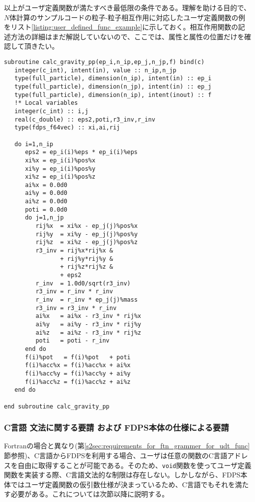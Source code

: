 以上がユーザ定義関数が満たすべき最低限の条件である。理解を助ける目的で、$N$体計算のサンプルコードの粒子-粒子相互作用に対応したユーザ定義関数の例をリスト\ref{listing:user_defined_func_example}に示しておく。相互作用関数の記述方法の詳細はまだ解説していないので、ここでは、属性と属性の位置だけを確認して頂きたい。

\begin{lstlisting}[caption=粒子-粒子相互作用に対応したユーザ定義関数の実装例,label=listing:user_defined_func_example]
subroutine calc_gravity_pp(ep_i,n_ip,ep_j,n_jp,f) bind(c)
   integer(c_int), intent(in), value :: n_ip,n_jp
   type(full_particle), dimension(n_ip), intent(in) :: ep_i
   type(full_particle), dimension(n_jp), intent(in) :: ep_j
   type(full_particle), dimension(n_ip), intent(inout) :: f
   !* Local variables
   integer(c_int) :: i,j
   real(c_double) :: eps2,poti,r3_inv,r_inv
   type(fdps_f64vec) :: xi,ai,rij
      
   do i=1,n_ip
      eps2 = ep_i(i)%eps * ep_i(i)%eps
      xi%x = ep_i(i)%pos%x
      xi%y = ep_i(i)%pos%y
      xi%z = ep_i(i)%pos%z
      ai%x = 0.0d0
      ai%y = 0.0d0
      ai%z = 0.0d0
      poti = 0.0d0
      do j=1,n_jp
         rij%x  = xi%x - ep_j(j)%pos%x
         rij%y  = xi%y - ep_j(j)%pos%y
         rij%z  = xi%z - ep_j(j)%pos%z
         r3_inv = rij%x*rij%x &
                + rij%y*rij%y &
                + rij%z*rij%z &
                + eps2
         r_inv  = 1.0d0/sqrt(r3_inv)
         r3_inv = r_inv * r_inv
         r_inv  = r_inv * ep_j(j)%mass
         r3_inv = r3_inv * r_inv
         ai%x   = ai%x - r3_inv * rij%x
         ai%y   = ai%y - r3_inv * rij%y
         ai%z   = ai%z - r3_inv * rij%z
         poti   = poti - r_inv
      end do
      f(i)%pot   = f(i)%pot   + poti
      f(i)%acc%x = f(i)%acc%x + ai%x
      f(i)%acc%y = f(i)%acc%y + ai%y
      f(i)%acc%z = f(i)%acc%z + ai%z
   end do

end subroutine calc_gravity_pp
\end{lstlisting}

\subsubsection{C言語 文法に関する要請 および FDPS本体の仕様による要請}
Fortranの場合と異なり(第\ref{s2sec:requirements_for_ftn_grammer_for_udt_func}節参照)、C言語からFDPSを利用する場合、ユーザは任意の関数のC言語アドレスを自由に取得することが可能である。そのため、\texttt{void}関数を使ってユーザ定義関数を実装する際、C言語文法的な制限は存在しない。しかしながら、FDPS本体ではユーザ定義関数の仮引数仕様が決まっているため、C言語でもそれを満たす必要がある。これについては次節以降に説明する。


